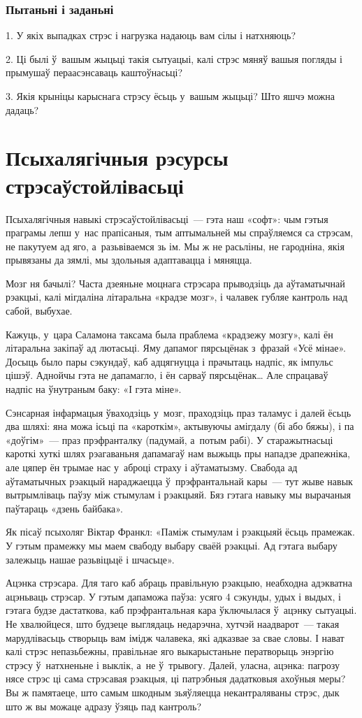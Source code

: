 \subsubsection{Пытаньні і заданьні}

1. У якіх выпадках стрэс і нагрузка надаюць вам сілы і натхняюць?

2. Ці былі ў~вашым жыцьці такія сытуацыі, калі стрэс мяняў вашыя погляды і прымушаў пераасэнсаваць каштоўнасьці?

3. Якія крыніцы карыснага стрэсу ёсьць у~вашым жыцьці? Што яшчэ можна дадаць?


\section{Псыхалягічныя рэсурсы стрэсаўстойлівасьці}

Псыхалягічныя навыкі стрэсаўстойлівасьці~--- гэта наш «софт»: чым гэтыя праграмы лепш у~нас прапісаныя, тым аптымальней мы спраўляемся са стрэсам, не пакутуем ад яго, а~разьвіваемся зь ім. Мы ж не расьліны, не гародніна, якія прывязаны да зямлі, мы здольныя адаптавацца і мяняцца.

Мозг ня бачылі? Часта дзеяньне моцнага стрэсара прыводзіць да аўтаматычнай рэакцыі, калі мігдаліна літаральна «крадзе мозг», і чалавек губляе кантроль над сабой, выбухае.

Кажуць, у~цара Саламона таксама была праблема «крадзежу мозгу», калі ён літаральна закіпаў ад лютасьці. Яму дапамог пярсьцёнак з~фразай «Усё мінае». Досыць было пары сэкундаў, каб адцягнуцца і прачытаць надпіс, як імпульс цішэў. Аднойчы гэта не дапамагло, і ён сарваў пярсьцёнак… Але спрацаваў надпіс на ўнутраным баку: «І гэта міне».

Сэнсарная інфармацыя ўваходзіць у~мозг, праходзіць праз таламус і далей ёсьць два шляхі: яна можа ісьці па «кароткім», актывуючы амігдалу (бі або бяжы), і па «доўгім»~--- праз прэфранталку (падумай, а~потым рабі). У старажытнасьці кароткі хуткі шлях рэагаваньня дапамагаў нам выжыць пры нападзе драпежніка, але цяпер ён трымае нас у~аброці страху і аўтаматызму. Свабода ад аўтаматычных рэакцый нараджаецца ў~прэфрантальнай кары~--- тут жыве навык вытрымліваць паўзу між стымулам і рэакцыяй. Бяз гэтага навыку мы вырачаныя паўтараць «дзень байбака».

Як пісаў псыхоляг Віктар Франкл: «Паміж стымулам і рэакцыяй ёсьць прамежак. У гэтым прамежку мы маем свабоду выбару сваёй рэакцыі. Ад гэтага выбару залежыць нашае разьвіцьцё і шчасьце».

Ацэнка стрэсара. Для таго каб абраць правільную рэакцыю, неабходна адэкватна ацэньваць стрэсар. У гэтым дапаможа паўза: усяго 4 сэкунды, удых і выдых, і гэтага будзе дастаткова, каб прэфрантальная кара ўключылася ў~ацэнку сытуацыі. Не хвалюйцеся, што будзеце выглядаць недарэчна, хутчэй наадварот~--- такая марудлівасьць створыць вам імідж чалавека, які адказвае за свае словы. І нават калі стрэс непазьбежны, правільнае яго выкарыстаньне ператворыць энэргію стрэсу ў~натхненьне і выклік, а~не ў~трывогу. Далей, уласна, ацэнка: пагрозу нясе стрэс ці сама стрэсавая рэакцыя, ці патрэбныя дадатковыя ахоўныя меры? Вы ж памятаеце, што самым шкодным зьяўляецца некантраляваны стрэс, дык што ж вы можаце адразу ўзяць пад кантроль?

